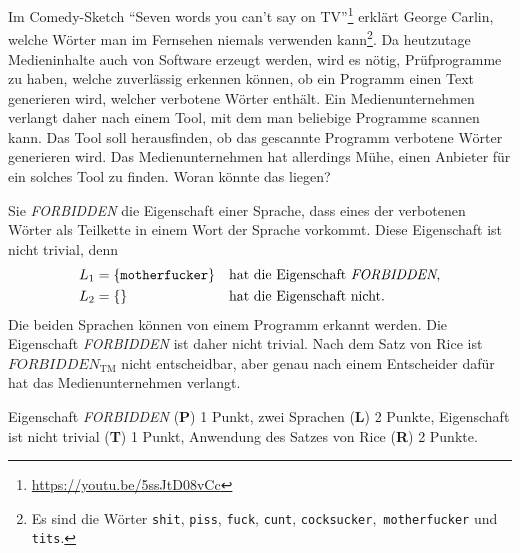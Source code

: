 Im Comedy-Sketch ``Seven words you can't say on TV''\footnote{\url{https://youtu.be/5ssJtD08vCc}} erklärt George Carlin,
welche Wörter man im Fernsehen niemals verwenden kann\footnote{Es sind die
Wörter \texttt{shit}, \texttt{piss}, \texttt{fuck}, \texttt{cunt}, 
\texttt{cocksucker}, \texttt{motherfucker} und \texttt{tits}.}.
Da heutzutage Medieninhalte auch von Software erzeugt werden, wird es nötig,
Prüfprogramme zu haben, welche zuverlässig erkennen können, ob ein Programm
einen Text generieren wird, welcher verbotene Wörter enthält.
Ein Medienunternehmen verlangt daher nach einem Tool, mit dem man
beliebige Programme scannen kann.
Das Tool soll herausfinden, ob das gescannte Programm verbotene Wörter
generieren wird.
Das Medienunternehmen hat allerdings Mühe, einen Anbieter für ein
solches Tool zu finden.
Woran könnte das liegen?

\begin{loesung}
Sie \textit{FORBIDDEN} die Eigenschaft einer Sprache, dass eines der 
verbotenen Wörter als Teilkette in einem Wort der Sprache vorkommt.
Diese Eigenschaft ist nicht trivial, denn 
\[
\begin{aligned}
L_1&=\{\texttt{motherfucker}\} &&\text{hat die Eigenschaft \textit{FORBIDDEN},}
\\
L_2&=\{\}&&\text{hat die Eigenschaft nicht.}
\end{aligned}
\]
Die beiden Sprachen können von einem Programm erkannt werden.
Die Eigenschaft \textit{FORBIDDEN} ist daher nicht trivial.
Nach dem Satz von Rice ist $\textit{FORBIDDEN}_{\text{TM}}$ nicht
entscheidbar, aber genau nach einem Entscheider dafür hat das
Medienunternehmen verlangt.
\end{loesung}

\begin{bewertung}
Eigenschaft \textit{FORBIDDEN} ({\bf P}) 1 Punkt,
zwei Sprachen ({\bf L}) 2 Punkte,
Eigenschaft ist nicht trivial ({\bf T}) 1 Punkt,
Anwendung des Satzes von Rice ({\bf R}) 2 Punkte.
\end{bewertung}


